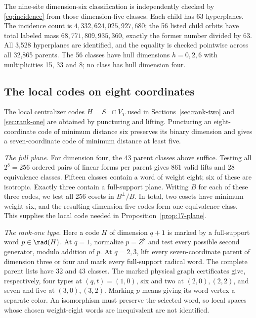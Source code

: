 The nine-site dimension-six classification is independently checked by
\eqref{eq:incidence} from those dimension-five classes. Each child has
63 hyperplanes. The incidence count is
\(4,332,624,025,927,680\); the 56 listed child orbits have total labeled
mass \(68,771,809,935,360\), exactly the former number divided by 63.
All 3,528 hyperplanes are identified, and the equality is checked
pointwise across all 32,865 parents. The 56 classes have hull
dimensions \(h=0,2,6\) with multiplicities 15, 33 and 8; no class has
hull dimension four.

\subsection{The local codes on eight coordinates}\label{sec:local-classifications}

The local centralizer codes \(H=S^\perp\cap V_T\) used in
Sections~\ref{sec:rank-two} and \ref{sec:rank-one} are obtained by
puncturing and lifting. Puncturing an eight-coordinate code of minimum
distance six preserves its binary dimension and gives a seven-coordinate
code of minimum distance at least five.

\emph{The full plane.} For dimension four, the 43 parent
classes above suffice. Testing all \(2^8=256\) ordered pairs
of linear forms per parent gives 861 valid lifts and 28 equivalence
classes. Fifteen classes contain a word of weight eight; six of these
are isotropic. Exactly three contain a full-support plane. Writing
\(B\) for each of these three codes, we test all 256 cosets in
\(B^\perp/B\). In total, two cosets have
minimum weight six, and the resulting dimension-five codes form one
equivalence class. This supplies the local code needed in
Proposition~\ref{prop:17-plane}.

\emph{The rank-one type.} Here a code \(H\) of dimension \(q+1\) is marked
by a full-support word \(p\in\rad(H)\). At \(q=1\), normalize
\(p=Z^8\) and test every possible second generator, modulo addition
of \(p\). At \(q=2,3\), lift every seven-coordinate parent of dimension
three or four and mark every full-support radical word. The complete
parent lists have 32 and 43 classes. The marked physical graph
certificates give, respectively, four types at \((q,t)=(1,0)\),
six and two at \((2,0),(2,2)\), and seven and five at
\((3,0),(3,2)\). Marking \(p\) means giving its word vertex a
separate color. An isomorphism must preserve the selected word, so
local spaces whose chosen weight-eight words are inequivalent are not
identified.
